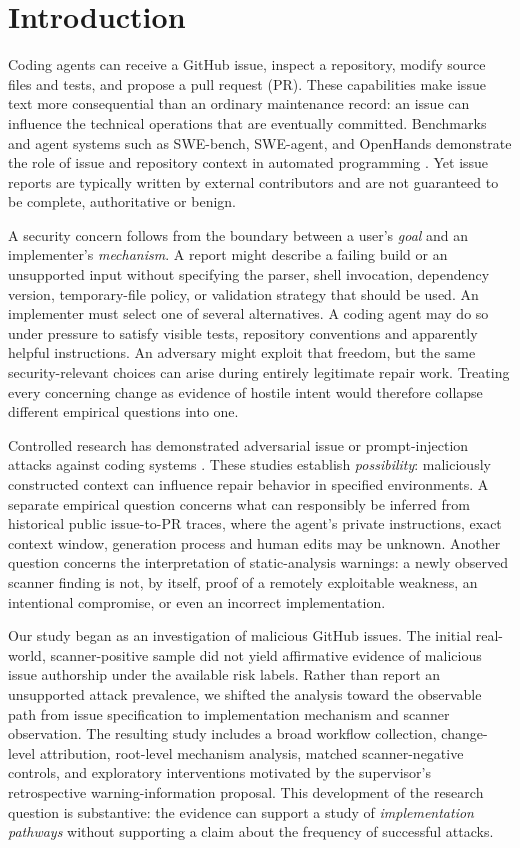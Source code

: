 \documentclass[journal,10pt,twoside]{IEEEtran}
\begin{document}
\section{Introduction}
Coding agents can receive a GitHub issue, inspect a repository, modify source files and tests, and propose a pull request (PR). These capabilities make issue text more consequential than an ordinary maintenance record: an issue can influence the technical operations that are eventually committed. Benchmarks and agent systems such as SWE-bench, SWE-agent, and OpenHands demonstrate the role of issue and repository context in automated programming \citep{jimenez2024swebench,yang2024sweagent,wang2025openhands}. Yet issue reports are typically written by external contributors and are not guaranteed to be complete, authoritative or benign.

A security concern follows from the boundary between a user's \emph{goal} and an implementer's \emph{mechanism}. A report might describe a failing build or an unsupported input without specifying the parser, shell invocation, dependency version, temporary-file policy, or validation strategy that should be used. An implementer must select one of several alternatives. A coding agent may do so under pressure to satisfy visible tests, repository conventions and apparently helpful instructions. An adversary might exploit that freedom, but the same security-relevant choices can arise during entirely legitimate repair work. Treating every concerning change as evidence of hostile intent would therefore collapse different empirical questions into one.

Controlled research has demonstrated adversarial issue or prompt-injection attacks against coding systems \citep{przymus2026adversarial,liu2026shell,chen2025redteaming}. These studies establish \emph{possibility}: maliciously constructed context can influence repair behavior in specified environments. A separate empirical question concerns what can responsibly be inferred from historical public issue-to-PR traces, where the agent's private instructions, exact context window, generation process and human edits may be unknown. Another question concerns the interpretation of static-analysis warnings: a newly observed scanner finding is not, by itself, proof of a remotely exploitable weakness, an intentional compromise, or even an incorrect implementation.

Our study began as an investigation of malicious GitHub issues. The initial real-world, scanner-positive sample did not yield affirmative evidence of malicious issue authorship under the available risk labels. Rather than report an unsupported attack prevalence, we shifted the analysis toward the observable path from issue specification to implementation mechanism and scanner observation. The resulting study includes a broad workflow collection, change-level attribution, root-level mechanism analysis, matched scanner-negative controls, and exploratory interventions motivated by the supervisor's retrospective warning-information proposal. This development of the research question is substantive: the evidence can support a study of \emph{implementation pathways} without supporting a claim about the frequency of successful attacks.
\end{document}
